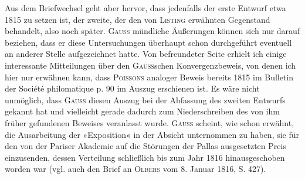 \par\noindent\hspace*{\parindent}Aus dem Briefwechsel geht aber hervor, dass jedenfalls der erste
Entwurf etwa 1815 zu setzen ist, der zweite, der den von \textsc{Listing} erwähnten
Gegenstand behandelt, also noch später. \textsc{Gauss} mündliche Äußerungen können sich
nur darauf beziehen, dass er diese Untersuchungen überhaupt schon durchgeführt
eventuell an anderer Stelle aufgezeichnet hatte. Von befreundeter Seite erhielt
ich einige interessante Mitteilungen über den \textsc{Gauss}schen Konvergenzbeweis,
von denen ich hier nur erwähnen kann, dass \textsc{Poissons} analoger Beweis bereits
1815 im Bulletin der Société philomatique p. 90 im Auszug erschienen ist.
Es wäre nicht unmöglich, dass \textsc{Gauss} diesen Auszug bei der Abfassung des zweiten
Entwurfs gekannt hat und vielleicht gerade dadurch zum Niederschreiben des von ihm
früher gefundenen Beweises veranlasst wurde. \textsc{Gauss} scheint, wie schon erwähnt,
die Ausarbeitung der »Exposition« in der Absicht unternommen zu haben, sie für den
von der Pariser Akademie auf die Störungen der Pallas ausgesetzten Preis
einzusenden, dessen Verteilung schließlich bis zum Jahr 1816 hinausgeschoben
worden war (vgl. auch den Brief an \textsc{Olbers} vom 8. Januar 1816, S. 427).
\endgroup
